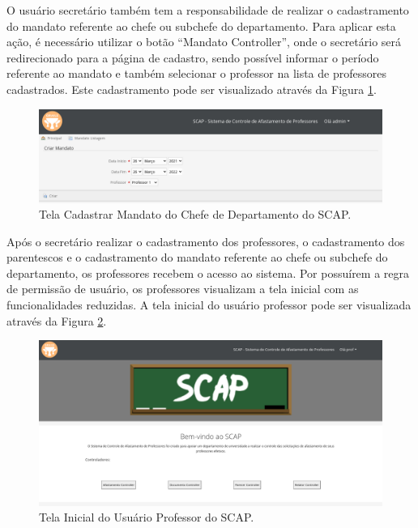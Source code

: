O usuário secretário também tem a responsabilidade de realizar o cadastramento do mandato referente ao chefe ou subchefe do departamento. Para aplicar esta ação, é necessário utilizar o botão ``Mandato Controller'', onde o secretário será redirecionado para a página de cadastro, sendo possível informar o período referente ao mandato e também selecionar o professor na lista de professores cadastrados. Este cadastramento pode ser visualizado através da Figura \ref{fig-projeto-cadastrar-mandato}. 

\begin{figure}[h]
	\centering
	\includegraphics[scale=0.33]{figuras/fig-projeto-cadastrar-mandato} 
	\caption{Tela Cadastrar Mandato do Chefe de Departamento do SCAP.}
	\label{fig-projeto-cadastrar-mandato}
\end{figure}

Após o secretário realizar o cadastramento dos professores, o cadastramento dos parentescos e o cadastramento do mandato referente ao chefe ou subchefe do departamento, os professores recebem o acesso ao sistema. Por possuírem a regra de permissão de usuário, os professores visualizam a tela inicial com as funcionalidades reduzidas. A tela inicial do usuário professor pode ser visualizada através da Figura \ref{fig-projeto-usuario-professor}. 

\begin{figure}[h]
	\centering
	\includegraphics[scale=0.33]{figuras/fig-projeto-usuario-professor} 
	\caption{Tela Inicial do Usuário Professor do SCAP.}
	\label{fig-projeto-usuario-professor}
\end{figure}

